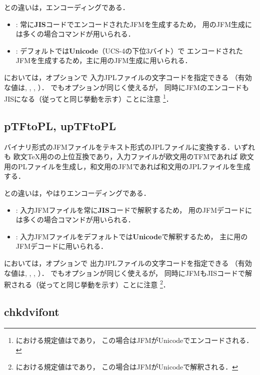 \documentclass[a4paper,11pt,nomag]{jsarticle}
\begin{document}
との違いは，エンコーディングである．
\begin{itemize}
  \item {}: 常に\textbf{JIS}コードでエンコードされたJFMを生成するため，
    \pTeX 用のJFM生成には多くの場合コマンドが用いられる．
  \item {}: デフォルトでは\textbf{Unicode}（UCS-4の下位3バイト）で
    エンコードされたJFMを生成するため，主に\upTeX 用のJFM生成に用いられる．
\end{itemize}

においては，オプションで
入力JPLファイルの文字コードを指定できる
（有効な値は, , , ）．
でもオプションが同じく使えるが，
同時にJFMのエンコードもJISになる（従ってと同じ挙動を示す）ことに注意
\footnote{における規定値はであり，
この場合はJFMがUnicodeでエンコードされる．}．

\subsection{pTFtoPL, upTFtoPL}

バイナリ形式のJFMファイルをテキスト形式のJPLファイルに変換する．いずれも
欧文\TeX 用のの上位互換であり，入力ファイルが欧文用のTFMであれば
欧文用のPLファイルを生成し，和文用のJFMであれば和文用のJPLファイルを生成する．

との違いは，やはりエンコーディングである．
\begin{itemize}
  \item {}: 入力JFMファイルを常に\textbf{JIS}コードで解釈するため，
    \pTeX 用のJFMデコードには多くの場合コマンドが用いられる．
  \item {}: 入力JFMファイルをデフォルトでは\textbf{Unicode}で解釈するため，
    主に\upTeX 用のJFMデコードに用いられる．
\end{itemize}

においては，オプションで
出力JPLファイルの文字コードを指定できる
（有効な値は, , , ）．
でもオプションが同じく使えるが，
同時にJFMもJISコードで解釈される（従ってと同じ挙動を示す）ことに注意
\footnote{における規定値はであり，
この場合はJFMがUnicodeで解釈される．}．

\subsection{chkdvifont}
\end{document}
